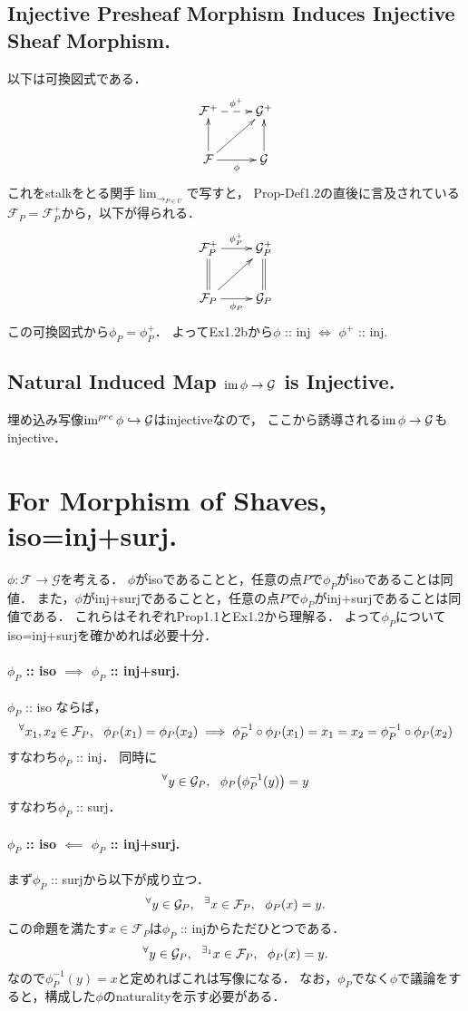 \documentclass[a4paper]{jsarticle}
\newcommand{\shF}{\mathcal{F}}
\newcommand{\shG}{\mathcal{G}}
\begin{document}
    \subsection{Injective Presheaf Morphism Induces Injective Sheaf Morphism.}
    以下は可換図式である．
    \[
    \xymatrix
    {
        \shF^+ \ar@{-->}[r]^{\phi^+} & \shG^+ \\
        \shF \ar[u] \ar[r]_-{\phi} \ar[ur]& \shG \ar[u]
    }
    \]
    これをstalkをとる関手$\lim_{\to_{P \in U}}$で写すと，
    Prop-Def1.2の直後に言及されている$\shF_P=\shF_P^+$から，以下が得られる．
    \[
    \xymatrix
    {
        \shF_P^+ \ar[r]^{\phi_P^+} & \shG_P^+ \\
        \shF_P \ar@{=}[u] \ar[r]_-{\phi_P} \ar[ur]& \shG_P \ar@{=}[u]
    }
    \]
    この可換図式から$\phi_P=\phi_P^+$．
    よってEx1.2bから$\phi$ :: inj $\iff$ $\phi^+$ :: inj.

    \subsection{Natural Induced Map $\im \phi \to \shG$ is Injective.}
    埋め込み写像$\im^{pre} \phi \hookrightarrow \shG$はinjectiveなので，
    ここから誘導される$\im \phi \to \shG$もinjective．

\section{For Morphism of Shaves, iso=inj+surj.} %
    $\phi: \shF \to \shG$を考える．
    $\phi$がisoであることと，任意の点$P$で$\phi_P$がisoであることは同値．
    また，$\phi$がinj+surjであることと，任意の点$P$で$\phi_P$がinj+surjであることは同値である．
    これらはそれぞれProp1.1とEx1.2から理解る．
    よって$\phi_P$についてiso=inj+surjを確かめれば必要十分．
    
    \paragraph{$\phi_P$ :: iso $\implies$ $\phi_P$ :: inj+surj.}
    $\phi_P$ :: iso ならば，
    \[
        \Forall{x_1, x_2 \in \shF_P}
        \phi_P(x_1)=\phi_P(x_2)
        \implies
        \phi_P^{-1} \circ \phi_P(x_1)=x_1=x_2=\phi_P^{-1} \circ \phi_P(x_2)
        \label{prop:ex15-inj}
    \]
    すなわち$\phi_P$ :: inj．
    同時に
    \[ \Forall{y \in \shG_P} \phi_P \big( \phi_P^{-1}(y) \big)=y \]
    すなわち$\phi_P$ :: surj．

    \paragraph{$\phi_P$ :: iso $\impliedby$ $\phi_P$ :: inj+surj.}
    まず$\phi_P$ :: surjから以下が成り立つ．
    \[ \Forall{y \in \shG_P} \Exists{x \in \shF_P} \phi_P(x)=y. \]
    この命題を満たす$x \in \shF_P$は$\phi_P$ :: injからただひとつである．
    \[ \Forall{y \in \shG_P} {}^{\exists_1} x \in \shF_P,~~ \phi_P(x)=y. \]
    なので$\phi_P^{-1}(y)=x$と定めればこれは写像になる．
    なお，$\phi_P$でなく$\phi$で議論をすると，構成した$\phi$のnaturalityを示す必要がある．
\end{document}
